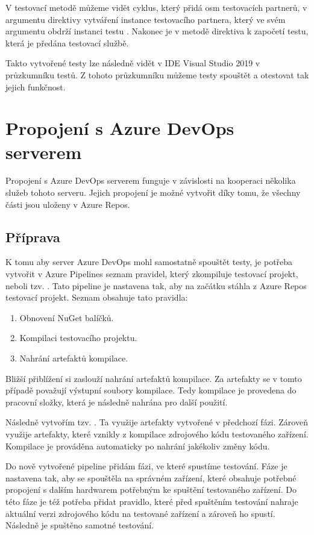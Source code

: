 V testovací metodě  můžeme vidět cyklus, který přidá osm testovacích partnerů, v argumentu direktivy vytváření instance testovacího partnera, který ve svém argumentu obdrží instanci testu . Nakonec je v metodě direktiva k započetí testu, která je předána testovací službě.

Takto vytvořené testy lze následně vidět v IDE Visual Studio 2019 v průzkumníku testů. Z tohoto průzkumníku můžeme testy spouštět a otestovat tak jejich funkčnost.  


\section{Propojení s Azure DevOps serverem}
Propojení s Azure DevOps serverem funguje v závislosti na kooperaci několika služeb tohoto serveru. Jejich propojení je možné vytvořit díky tomu, že všechny části jsou uloženy v Azure Repos. 

\subsection{Příprava}
K tomu aby server Azure DevOps mohl samostatně spouštět testy, je potřeba vytvořit v Azure Pipelines seznam pravidel, který zkompiluje testovací projekt, neboli tzv. . Tato pipeline je nastavena tak, aby na začátku stáhla z Azure Repos testovací projekt. Seznam obsahuje tato pravidla:

\begin{enumerate}
    \item Obnovení NuGet balíčků.
    \item Kompilaci testovacího projektu.
    \item Nahrání artefaktů kompilace.
\end{enumerate}

Bližší přiblížení si zaslouží nahrání artefaktů kompilace. Za artefakty se v tomto případě považují výstupní soubory kompilace. Tedy kompilace je provedena do pracovní složky, která je následně nahrána pro další použití. 

Následně vytvořím tzv. . Ta využije artefakty vytvořené v předchozí fázi.
Zároveň využije artefakty, které vznikly z kompilace zdrojového kódu testovaného zařízení. Kompilace je prováděna automaticky po nahrání jakékoliv změny kódu.

Do nově vytvořené pipeline přidám fázi, ve které spustíme testování. Fáze je nastavena tak, aby se spouštěla na správném zařízení, které obsahuje potřebné propojení s dalším hardwarem potřebným ke spuštění testovaného zařízení. Do této fáze je též potřeba přidat pravidlo, které před spuštěním testování nahraje aktuální verzi zdrojového kódu na testované zařízení a zároveň ho spustí. Následně je spuštěno samotné testování.


